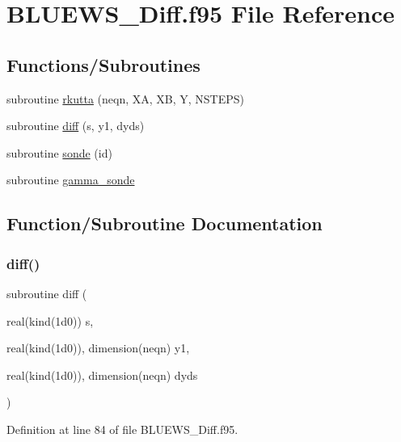 \hypertarget{_b_l_u_e_w_s___diff_8f95}{}\section{B\+L\+U\+E\+W\+S\+\_\+\+Diff.\+f95 File Reference}
\label{_b_l_u_e_w_s___diff_8f95}
\subsection*{Functions/\+Subroutines}
\begin{DoxyCompactItemize}
\item 
subroutine \hyperlink{_b_l_u_e_w_s___diff_8f95_aa6b01ddf379446848f8a822a7918fcd0}{rkutta} (neqn, XA, XB, Y, N\+S\+T\+E\+PS)
\item 
subroutine \hyperlink{_b_l_u_e_w_s___diff_8f95_ac594a7935b340caab469006de9da9358}{diff} (s, y1, dyds)
\item 
subroutine \hyperlink{_b_l_u_e_w_s___diff_8f95_a63eab50bdd789005154d787035910277}{sonde} (id)
\item 
subroutine \hyperlink{_b_l_u_e_w_s___diff_8f95_a27fc32bfb9bfb2d6e21511c2e8c9bfed}{gamma\+\_\+sonde}
\end{DoxyCompactItemize}


\subsection{Function/\+Subroutine Documentation}
\mbox{\label{_b_l_u_e_w_s___diff_8f95_ac594a7935b340caab469006de9da9358}} 
\subsubsection{\texorpdfstring{diff()}{diff()}}
{\footnotesize\ttfamily subroutine diff (\begin{DoxyParamCaption}\item[{real(kind(1d0))}]{s,  }\item[{real(kind(1d0)), dimension(neqn)}]{y1,  }\item[{real(kind(1d0)), dimension(neqn)}]{dyds }\end{DoxyParamCaption})}



Definition at line 84 of file B\+L\+U\+E\+W\+S\+\_\+\+Diff.\+f95.

